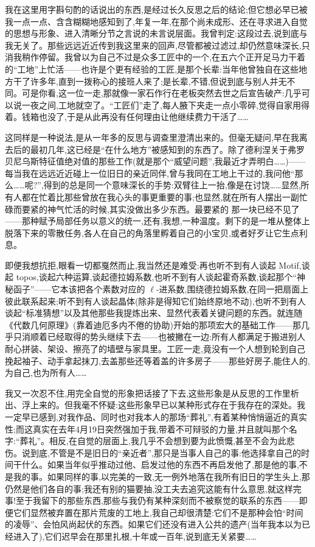 我在这里用字斟句酌的话说出的东西,是经过长久反思之后的结论;但它想必早已被我一点一点、含含糊糊地感知到了,年复一年,在那个尚未成形、还在寻求进入自觉的思想与形象、进入清晰分节之言说的未言说层面。我曾判定:这段过去,说到底与我无关了。那些远远近近传到我这里来的回声,尽管都被过滤过,却仍然意味深长,只消我稍作停留。我曾以为自己不过是众多工匠中的一个,在五六个正开足马力干着的“工地”上忙活——也许是个更有经验的工匠,是那个长辈:当年他曾独自在这些地方干了许多年,直到一拨称心的接班人来了;是长辈,不错,但说到底与别人并无不同。可是你看,这一位一走,那就像一家石作行在老板突然去世之后宣告破产:几乎可以说一夜之间,工地就空了。“工匠们”走了,每人腋下夹走一点小零碎,觉得自家用得着。钱箱也没了,于是从此再没有任何理由让他继续费力干活了……

这同样是一种说法,是从一年多的反思与调查里澄清出来的。但毫无疑问,早在我离去后的最初几年,这已经是“在什么地方”被感知到的东西了。除了德利涅关于弗罗贝尼乌斯特征值绝对值的那些工作(就是那个“威望问题”,我最近才弄明白……)——每当我在远远近近碰上一位旧日的亲近同伴,曾与我同在工地上干过的,我问他“那么……呢?”,得到的总是同一个意味深长的手势:双臂往上一抬,像是在讨饶……显然,所有人都在忙着比那些曾放在我心头的事更重要的事;也显然,就在所有人摆出一副忙碌而要紧的神气忙活的时候,其实没做出多少东西。最要紧的
那一块已经不见了——那种赋予局部任务以意义的统一,还有,我想,一种温度。剩下的是一堆从整体上脱落下来的零散任务,各人在自己的角落里孵着自己的小宝贝,或者好歹让它生点利息。

即便我想抗拒,眼看一切都戛然而止,我当然还是难受:再也听不到有人谈起 Motif,谈起 topos,谈起六种运算,谈起德拉姆系数,也听不到有人谈起霍奇系数,谈起那个“神秘函子”——它本该把各个素数对应的 $\ell$-进系数,围绕德拉姆系数,在同一把扇面上彼此联系起来;听不到有人谈起晶体(除非是得知它们始终原地不动),也听不到有人谈起“标准猜想”以及其他那些我提炼出来、显然代表着关键问题的东西。就连随《代数几何原理》(靠着迪厄多内不倦的协助)开始的那项宏大的基础工作——那几乎只消顺着已经取得的势头继续下去——也被撇在一边:所有人都满足于搬进别人耐心拼装、架设、擦亮了的墙壁与家具里。工匠一走,竟没有一个人想到轮到自己挽起袖子、动手拿起抹刀,去盖那些还等着盖的许多房子——那些好房子,能住人的,为自己,也为所有人……

我又一次忍不住,用完全自觉的形象把话接了下去,这些形象是从反思的工作里析出、浮上来的。但我毫不怀疑:这些形象早已以某种形式存在于我存在的深处。我一定早已感到,对我作品、同时也对我本人的那场“葬礼”,有着某种悄悄逼近的真实性;而这真实在去年4月19日突然强加于我,带着不可辩驳的力量,并且就叫那个名字:“葬礼”。相反,在自觉的层面上,我几乎不会想到要为此愤慨,甚至不会为此悲伤。说到底,不管是不是旧日的“亲近者”,那只是当事人自己的事:他选择拿自己的时间干什么。如果当年似乎推动过他、启发过他的东西不再启发他了,那是他的事,不是我的事。如果同样的事,以完美的一致,无一例外地落在我所有旧日的学生头上,那仍然是他们各自的事;我还有别的猫要抽,没工夫去追究这能有什么意思,就这样完事!至于我留下的那些东西,那些与我仍有某种深刻而不被察觉的联系的东西——即便它们显然被弃置在那片荒废的工地上,我自己却很清楚:它们不是那种会怕“时间的凌辱”、会怕风尚起伏的东西。如果它们还没有进入公共的遗产(当年我本以为已经进入了),它们迟早会在那里扎根,十年或一百年,说到底无关紧要……

